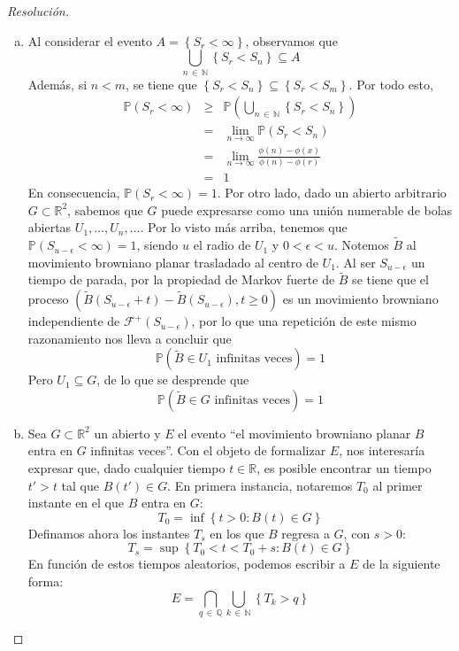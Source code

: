 \documentclass[a4paper,11pt]{article}
\newcommand{\Prob}[1]{\ensuremath{\mathbb{P} \left( #1 \right)}}
\newcommand{\Ev}[1]{\ensuremath{\left\{ #1 \right\}}}
\begin{document}
\begin{proof}[Resoluci\'on]
\begin{enumerate}[a.]
    \item Al considerar el evento $A = \Ev{S_r < \infty}$, observamos que
    $$\bigcup_{n \, \in \, \mathbb{N}}{\Ev{S_r < S_n}} \subseteq A$$
    Además, si $n < m$, se tiene que $\Ev{S_r < S_n} \subseteq \Ev{S_r < S_m}$. Por todo esto,
    \begin{eqnarray*}
        \Prob{S_r < \infty} &\geq& \Prob{\bigcup_{n \, \in \, \mathbb{N}}{\Ev{S_r < S_n}}} \\
            &=& \lim_{n \to \infty}{\Prob{S_r < S_n}} \\
            &=& \lim_{n \to \infty}{\frac{\phi(n) - \phi(x)}{\phi(n) - \phi(r)}} \\
            &=& 1
    \end{eqnarray*}
    En consecuencia, $\Prob{S_r < \infty} = 1$. Por otro lado, dado un abierto arbitrario
    $G \subset \mathbb{R}^2$, sabemos que $G$ puede expresarse como una unión numerable
    de bolas abiertas $U_1,\dots,U_n,\dots$.
    Por lo visto más arriba, tenemos que $\Prob{S_{u - \epsilon} < \infty} = 1$,
    siendo $u$ el radio de $U_1$ y $0 < \epsilon < u$. Notemos $\tilde{B}$ al movimiento
    browniano planar trasladado al centro de $U_1$. Al ser $S_{u - \epsilon}$ un
    tiempo de parada, por la propiedad de Markov fuerte de $\tilde{B}$ se tiene que el proceso
    $(\tilde{B}(S_{u-\epsilon} + t) - \tilde{B}(S_{u-\epsilon}), t \geq 0)$
    es un movimiento browniano independiente de $\mathcal{F}^{+}(S_{u-\epsilon})$,
    por lo que una repetición de este mismo razonamiento nos lleva a concluir que 
    $$\Prob{\tilde{B} \in U_1 \textrm{ infinitas veces}} = 1$$
    Pero $U_1 \subseteq G$, de lo que se desprende que
    $$\Prob{\tilde{B} \in G \textrm{ infinitas veces}} = 1$$

    \item Sea $G \subset \mathbb{R}^2$ un abierto y $E$ el evento ``el movimiento browniano planar
    $B$ entra en $G$ infinitas veces''. Con el objeto de formalizar $E$, nos interesaría expresar
    que, dado cualquier tiempo $t \in \mathbb{R}$, es posible encontrar un tiempo $t' > t$ tal que
    $B(t') \in G$. En primera instancia, notaremos $T_0$ al primer instante en el que $B$ entra
    en $G$:
    $$T_0 = \inf \left\{ t > 0 : B(t) \in G \right\}$$
    Definamos ahora los instantes $T_s$ en los que $B$ regresa a $G$, con $s > 0$:
    $$T_s = \sup \left\{ T_0 < t < T_0+s : B(t) \in G \right\}$$
    En función de estos tiempos aleatorios, podemos escribir a $E$ de la siguiente forma:
    $$E = \bigcap_{q \, \in \, \mathbb{Q}}{\bigcup_{k \, \in \, \mathbb{N}}{\Ev{T_k > q}}}$$


\end{enumerate}
\end{proof}
\end{document}
